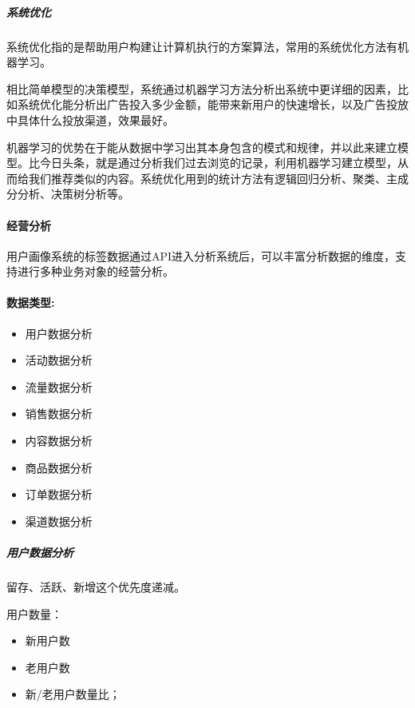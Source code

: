 \documentclass[letterpaper,10pt,english]{sphinxmanual}
\begin{document}
\subparagraph{系统优化}
\label{\detokenize{chapter_knowledge/data_analysis:id7}}
系统优化指的是帮助用户构建让计算机执行的方案算法，常用的系统优化方法有机器学习。

相比简单模型的决策模型，系统通过机器学习方法分析出系统中更详细的因素，比如系统优化能分析出广告投入多少金额，能带来新用户的快速增长，以及广告投放中具体什么投放渠道，效果最好。

机器学习的优势在于能从数据中学习出其本身包含的模式和规律，并以此来建立模型。比今日头条，就是通过分析我们过去浏览的记录，利用机器学习建立模型，从而给我们推荐类似的内容。系统优化用到的统计方法有逻辑回归分析、聚类、主成分分析、决策树分析等。


\paragraph{经营分析}
\label{\detokenize{chapter_knowledge/data_analysis:id8}}
用户画像系统的标签数据通过API进入分析系统后，可以丰富分析数据的维度，支持进行多种业务对象的经营分析。


\paragraph{数据类型:}
\label{\detokenize{chapter_knowledge/data_analysis:id9}}\begin{itemize}
\item {} 
用户数据分析

\item {} 
活动数据分析

\item {} 
流量数据分析

\item {} 
销售数据分析

\item {} 
内容数据分析

\item {} 
商品数据分析

\item {} 
订单数据分析

\item {} 
渠道数据分析

\end{itemize}


\subparagraph{用户数据分析}
\label{\detokenize{chapter_knowledge/data_analysis:id10}}
留存、活跃、新增这个优先度递减。

用户数量：
\begin{itemize}
\item {} 
新用户数

\item {} 
老用户数

\item {} 
新/老用户数量比；

\end{itemize}
\end{document}
